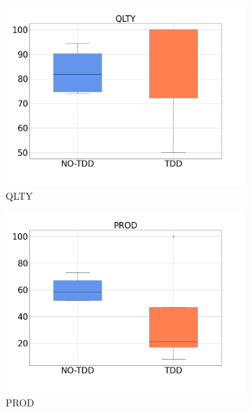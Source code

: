 \begin{figure}[H]
    \centering
    \begin{subfigure}{0.33\textwidth}
        \includegraphics[width=\linewidth]{figures/box_plots/task2/QLTY.png}
        \caption{QLTY}
        \label{bp_task2_prod}
    \end{subfigure}\hfil
        \begin{subfigure}{0.33\textwidth}
        \includegraphics[width=\linewidth]{figures/box_plots/task2/PROD.png}
        \caption{PROD}
        \label{bp_task2_prod}
    \end{subfigure}\hfil
    \begin{subfigure}{0.33\textwidth}

\end{subfigure}
\end{figure}
